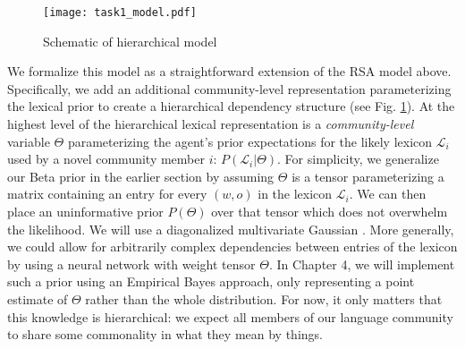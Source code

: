 \begin{figure}
\centering
    \texttt{[image: task1\_model.pdf]}
  \caption{Schematic of hierarchical model}
  \label{fig:task1model}
\end{figure}

We formalize this model as a straightforward extension of the RSA model above.
Specifically, we add an additional community-level representation parameterizing the lexical prior to create a hierarchical dependency structure (see Fig. \ref{fig:task1model}). 
At the highest level of the hierarchical lexical representation is a \emph{community-level} variable $\Theta$ parameterizing the agent's prior expectations for the likely lexicon $\mathcal{L}_i$ used by a novel community member $i$: $P(\mathcal{L}_i | \Theta)$. 
For simplicity, we generalize our Beta prior in the earlier section by assuming $\Theta$ is a tensor parameterizing a matrix containing an entry for every $(w,o)$ in the lexicon $\mathcal{L}_i$.  
We can then place an uninformative prior $P(\Theta)$ over that tensor which does not overwhelm the likelihood.
We will use a diagonalized multivariate Gaussian \cite<but see>[p. 110, for other reasonable choices]{gelman_bayesian_2014}. 
More generally, we could allow for arbitrarily complex dependencies between entries of the lexicon by using a neural network with weight tensor $\Theta$.
In Chapter 4, we will implement such a prior using an Empirical Bayes approach, only representing a point estimate of $\Theta$ rather than the whole distribution.
For now, it only matters that this knowledge is hierarchical: we expect all members of our language community to share some commonality in what they mean by things. 

